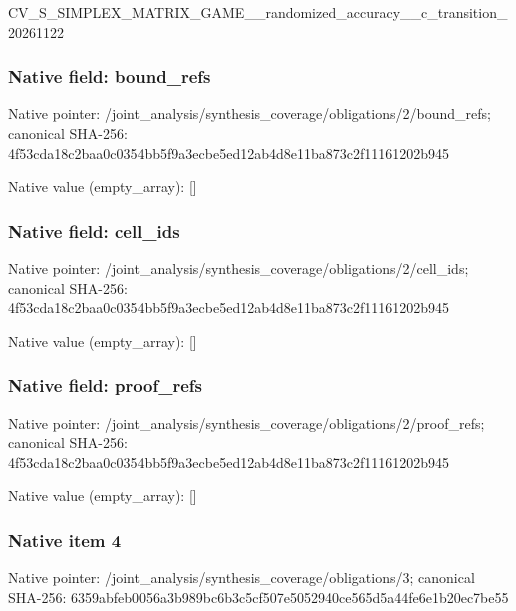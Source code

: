 \documentclass[10pt,a4paper]{article}
\begin{document}
CV\_S\_SIMPLEX\_MATRIX\_GAME\allowbreak{}\_\_randomized\_accuracy\_\_c\allowbreak{}\_transition\_20261122


\subsubsection{Native field: bound\_refs}


Native pointer: /joint\_analysis/synthesi\allowbreak{}s\_coverage/obligations/2\allowbreak{}/bound\_refs; canonical SHA-256: 4f53cda18c2baa0c0354bb5f\allowbreak{}9a3ecbe5ed12ab4d8e11ba87\allowbreak{}3c2f11161202b945



Native value (empty\_array): []



\subsubsection{Native field: cell\_ids}


Native pointer: /joint\_analysis/synthesi\allowbreak{}s\_coverage/obligations/2\allowbreak{}/cell\_ids; canonical SHA-256: 4f53cda18c2baa0c0354bb5f\allowbreak{}9a3ecbe5ed12ab4d8e11ba87\allowbreak{}3c2f11161202b945



Native value (empty\_array): []



\subsubsection{Native field: proof\_refs}


Native pointer: /joint\_analysis/synthesi\allowbreak{}s\_coverage/obligations/2\allowbreak{}/proof\_refs; canonical SHA-256: 4f53cda18c2baa0c0354bb5f\allowbreak{}9a3ecbe5ed12ab4d8e11ba87\allowbreak{}3c2f11161202b945



Native value (empty\_array): []



\subsubsection{Native item 4}


Native pointer: /joint\_analysis/synthesi\allowbreak{}s\_coverage/obligations/3; canonical SHA-256: 6359abfeb0056a3b989bc6b3\allowbreak{}c5cf507e5052940ce565d5a4\allowbreak{}4fe6e1b20ec7be55
\end{document}
